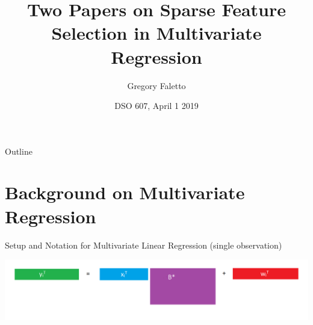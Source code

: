 \documentclass[notes]{beamer}       %
\title{Two Papers on Sparse Feature Selection in Multivariate Regression}
\author{Gregory Faletto}
\institute[USC Marshall] %
{
  Department of Data Sciences and Operations\\
  Statistics Group \\
  University of Southern California Marshall School of Business}
\date{DSO 607, April 1 2019}
\begin{document}
\begin{frame}
  \titlepage
\end{frame}

\begin{frame}{Outline}
  \tableofcontents
\end{frame}



\section{Background on Multivariate Regression}

%

\begin{frame}{Setup and Notation for Multivariate Linear Regression (single observation)}{}
\begin{center}
\includegraphics[scale=0.22]{diagram1.png}
\end{center}
\end{frame}
\end{document}
